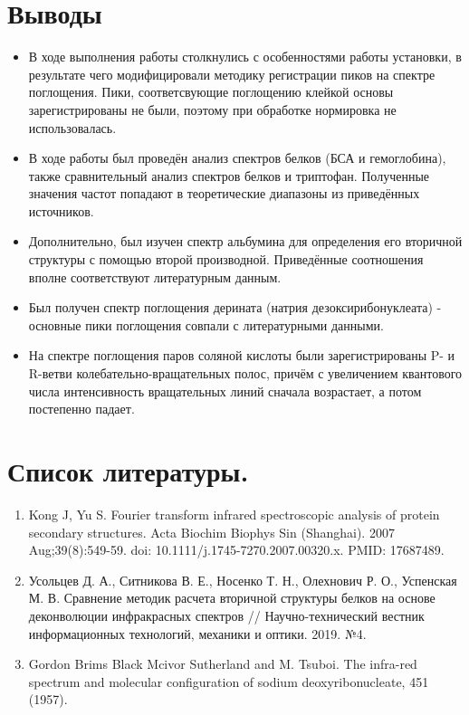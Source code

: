 \documentclass{article}
\begin{document}
\section{Выводы}
\begin{itemize}
    \item В ходе выполнения работы столкнулись с особенностями работы установки, в результате чего модифицировали методику регистрации пиков на спектре поглощения. Пики, соответсвующие поглощению клейкой основы зарегистрированы не были, поэтому при обработке нормировка не использовалась.
    \item В ходе работы был проведён анализ спектров белков (БСА и гемоглобина), также сравнительный анализ спектров белков и триптофан. Полученные значения частот попадают в теоретические диапазоны из приведённых источников.
    \item Дополнительно, был изучен спектр альбумина для определения его вторичной структуры с помощью второй производной. Приведённые соотношения вполне соответствуют литературным данным.
    \item Был получен спектр поглощения дерината (натрия дезоксирибонуклеата) - основные пики поглощения совпали с литературными данными.
    \item На спектре поглощения паров соляной кислоты были зарегистрированы P- и R-ветви колебательно-вращательных полос, причём с увеличением квантового числа интенсивность вращательных линий сначала возрастает, а потом постепенно падает.
\end{itemize}

\section{Список литературы.}
\begin{enumerate}
    \item Kong J, Yu S. Fourier transform infrared spectroscopic analysis of protein secondary structures. Acta Biochim Biophys Sin (Shanghai). 2007 Aug;39(8):549-59. doi: 10.1111/j.1745-7270.2007.00320.x. PMID: 17687489.   
    \item Усольцев Д. А., Ситникова В. Е., Носенко Т. Н., Олехнович Р. О., Успенская М. В. Сравнение методик расчета вторичной структуры белков на основе деконволюции инфракрасных спектров // Научно-технический вестник информационных технологий, механики и оптики. 2019. №4. 
    \item Gordon Brims Black Mcivor Sutherland and M. Tsuboi. The infra-red spectrum and molecular configuration of sodium deoxyribonucleate, 451 (1957).
\end{enumerate}
\end{document}
